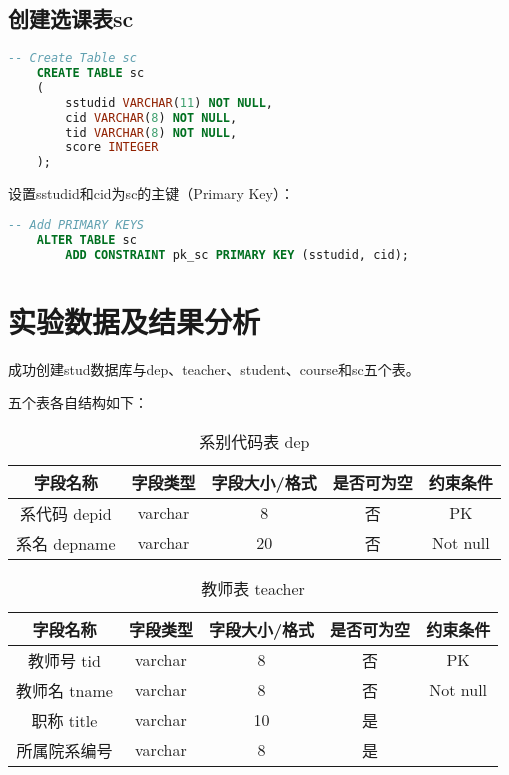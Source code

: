 \documentclass[a4paper]{uestcreport}
\begin{document}
\subsection{创建选课表sc}
\begin{lstlisting}[language=SQL]
    -- Create Table sc
    CREATE TABLE sc
    (
        sstudid VARCHAR(11) NOT NULL,
        cid VARCHAR(8) NOT NULL,
        tid VARCHAR(8) NOT NULL,
        score INTEGER
    );
\end{lstlisting}

设置sstudid和cid为sc的主键（Primary Key）：
\begin{lstlisting}[language=SQL]
    -- Add PRIMARY KEYS
    ALTER TABLE sc
        ADD CONSTRAINT pk_sc PRIMARY KEY (sstudid, cid);
\end{lstlisting}

\section{实验数据及结果分析}
成功创建stud数据库与dep、teacher、student、course和sc五个表。

五个表各自结构如下：
\begin{table}[!h]
    \centering
    \caption{系别代码表 dep}\label{tab:depTable}%
    \begin{tabular}{|c|c|c|c|c|}
        \hline
        字段名称     & 字段类型 & 字段大小/格式 & 是否可为空 & 约束条件 \\
        \hline
        系代码 depid & varchar  & 8             & 否         & PK       \\
        \hline
        系名 depname & varchar  & 20            & 否         & Not null \\
        \hline
    \end{tabular}
\end{table}

\begin{table}[!h]
    \centering
    \caption{教师表 teacher}\label{tab:teacherTable}%
    \begin{tabular}{|c|c|c|c|c|}
        \hline
        字段名称     & 字段类型 & 字段大小/格式 & 是否可为空 & 约束条件 \\
        \hline
        教师号 tid   & varchar  & 8             & 否         & PK       \\
        \hline
        教师名 tname & varchar  & 8             & 否         & Not null \\
        \hline
        职称 title   & varchar  & 10            & 是         &          \\
        \hline
        所属院系编号 & varchar  & 8             & 是         &          \\
        \hline
    \end{tabular}
\end{table}
\end{document}
